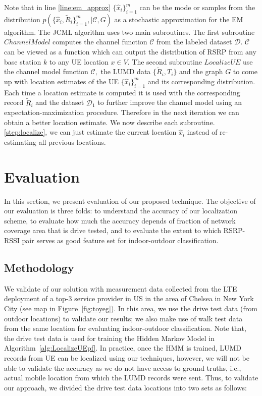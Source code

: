 \documentclass[conference, 10pt]{IEEEtran}
\begin{document}
Note that in line \ref{line:em_approx} $\{\hat{x}_i\}_{i=1}^m$ can be the mode
or samples from the distribution
$p(\{\hat{x}_i,\tilde{R}_i\}_{i=1}^m,|\mathcal{C},G)$ as a stochastic
approximation for the EM algorithm. The JCML algorithm uses two main
subroutines. The first subroutine $ChannelModel$ computes the channel function
$\mathcal{C}$ from the labeled dataset $\mathcal{D}.$ $\mathcal{C}$ can be
viewed as a function which can output the distribution of RSRP from any base
station $k$ to any UE location $x \in V.$ The second subroutine $LocalizeUE$
use the channel model function $\mathcal{C},$ the LUMD data
$\{\tilde{R}_i,T_i\}$ and the graph $G$ to come up with location estimates of
the UE $\{\hat{x}_i\}_{i=1}^m$ and its corresponding distribution. Each time a
location estimate is computed it is used with the corresponding record
$\tilde{R}_i$ and the dataset $\mathcal{D}_1$ to further improve the channel
model using an expectation-maximization procedure. Therefore in the next
iteration we can obtain a better location estimate. We now describe each
subroutine. %
\ref{step:localize}, we can just estimate the current location $\hat{x}_i$
instead of re-estimating all previous locations.


\section{Evaluation}
\label{sec:eval}

In this section, we present evaluation of our proposed technique. The objective of
our evaluation is three folds: to understand the accuracy of our localization scheme, to evaluate
how much the accuracy depends of fraction of network coverage area that is drive
tested, and to evaluate the extent to which RSRP-RSSI pair serves as good feature set
for indoor-outdoor classification.

\subsection{Methodology}
We validate of our solution with measurement data collected from the LTE deployment of a top-3 service
provider in US in the area of Chelsea in New York City (see map in
Figure~\ref{fig:toyeg}). In this area, we use the
drive test data (from outdoor locations) to validate our results; we also make use of
walk test data from the same location for evaluating indoor-outdoor classification. Note that, the
drive test data is used for training the Hidden Markov Model in
Algorithm~\ref{alg:LocalizeUEpf}. In practice, once the HMM is trained, LUMD records
from UE can be localized using our techniques, however, we will not be able to
validate the accuracy as we do not have access to ground truths, i.e., actual mobile
location from which the LUMD records were sent. Thus, to validate our approach, we divided the
drive test data locations into two sets as follows:
\end{document}
